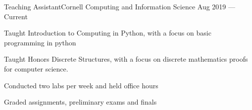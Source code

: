 \documentclass{resume}
\begin{document}
\begin{experience}

    \begin{entry}{Teaching Assistant}{Cornell Computing and Information Science}
        {Aug 2019 --- Current}
        \begin{description}
            \item Taught Introduction to Computing in Python, with a focus
                on basic programming in python
            \item Taught Honors Discrete Structures, with a focus on
                discrete mathematics proofs for computer science.
            \item Conducted two labs per week and held office hours
            \item Graded assignments, preliminary exams and finals
        \end{description}
    \end{entry}
\end{experience}
\end{document}
